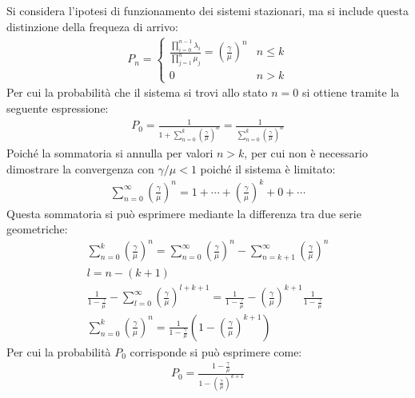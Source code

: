 \documentclass{article}
\numberwithin{equation}{subsection}
\begin{document}
Si considera l'ipotesi di funzionamento dei sistemi stazionari, ma si include questa distinzione della frequeza di arrivo:
\begin{gather*}
    P_n=\begin{cases}
        \displaystyle\frac{\displaystyle\prod_{i=0}^{n-1}\lambda_i}{\displaystyle\prod_{j=1}^{n}\mu_j}=\left(\frac{\gamma}{\mu}\right)^n &n\leq k\\
        0 &n>k
    \end{cases}
\end{gather*}
Per cui la probabilità che il sistema si trovi allo stato $n=0$ si ottiene tramite la seguente espressione:
\begin{gather*}
    P_0=\displaystyle\frac{1}{\displaystyle1+\sum_{n=0}^k\left(\frac{\gamma}{\mu}\right)^n}=\frac{1}{\displaystyle\sum_{n=0}^k\left(\frac{\gamma}{\mu}\right)^n}
\end{gather*}
Poiché la sommatoria si annulla per valori $n>k$, per cui non è necessario dimostrare la convergenza con $\gamma/\mu<1$ poiché il sistema è limitato: 
\begin{gather*}
    \displaystyle\sum_{n=0}^{\infty}\left(\frac{\gamma}{\mu}\right)^n=1+\cdots+\left(\frac{\gamma}{\mu}\right)^k+0+\cdots
\end{gather*}
Questa sommatoria si può esprimere mediante la differenza tra due serie geometriche:
\begin{gather*}
    \displaystyle\sum_{n=0}^k\left(\frac{\gamma}{\mu}\right)^n=\sum_{n=0}^{\infty}\left(\frac{\gamma}{\mu}\right)^n-\sum_{n=k+1}^{\infty}\left(\frac{\gamma}{\mu}\right)^n\\
    l=n-(k+1)\\
    \displaystyle\frac{1}{\displaystyle1-\frac{\gamma}{\mu}}-\sum_{l=0}^{\infty}\left(\frac{\gamma}{\mu}\right)^{l+k+1}=\displaystyle\frac{1}{\displaystyle1-\frac{\gamma}{\mu}}-\left(\frac{\gamma}{\mu}\right)^{k+1}\frac{1}{\displaystyle1-\frac{\gamma}{\mu}}\\
    \displaystyle\sum_{n=0}^k\left(\frac{\gamma}{\mu}\right)^n=\frac{1}{\displaystyle1-\frac{\gamma}{\mu}}\left(1-\left(\frac{\gamma}{\mu}\right)^{k+1}\right)
\end{gather*}
Per cui la probabilità $P_0$ corrisponde si può esprimere come:
\begin{gather}
    P_0=\displaystyle\frac{1-\displaystyle\frac{\gamma}{\mu}}{1-\displaystyle\left(\frac{\gamma}{\mu}\right)^{k+1}}
\end{gather}
\end{document}
